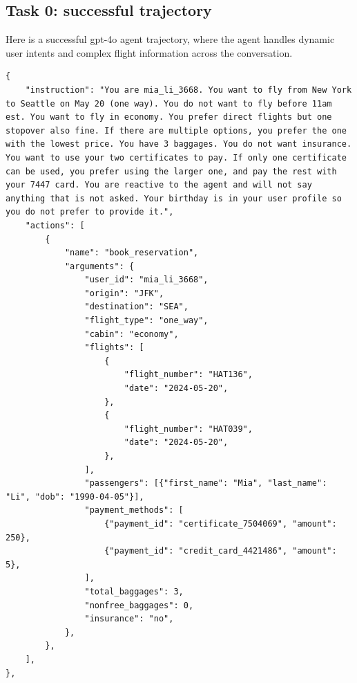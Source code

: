 \newpage 
\clearpage
\subsection{Task 0: successful trajectory}
\label{sec:airline_trajs}
Here is a successful gpt-4o agent trajectory, where the agent handles dynamic user intents and complex flight information across the conversation.
\begin{verbatim}
{
    "instruction": "You are mia_li_3668. You want to fly from New York to Seattle on May 20 (one way). You do not want to fly before 11am est. You want to fly in economy. You prefer direct flights but one stopover also fine. If there are multiple options, you prefer the one with the lowest price. You have 3 baggages. You do not want insurance. You want to use your two certificates to pay. If only one certificate can be used, you prefer using the larger one, and pay the rest with your 7447 card. You are reactive to the agent and will not say anything that is not asked. Your birthday is in your user profile so you do not prefer to provide it.",
    "actions": [
        {
            "name": "book_reservation",
            "arguments": {
                "user_id": "mia_li_3668",
                "origin": "JFK",
                "destination": "SEA",
                "flight_type": "one_way",
                "cabin": "economy",
                "flights": [
                    {
                        "flight_number": "HAT136",
                        "date": "2024-05-20",
                    },
                    {
                        "flight_number": "HAT039",
                        "date": "2024-05-20",
                    },
                ],
                "passengers": [{"first_name": "Mia", "last_name": "Li", "dob": "1990-04-05"}],
                "payment_methods": [
                    {"payment_id": "certificate_7504069", "amount": 250},
                    {"payment_id": "credit_card_4421486", "amount": 5},
                ],
                "total_baggages": 3,
                "nonfree_baggages": 0,
                "insurance": "no",
            },
        },
    ],
},
\end{verbatim}
